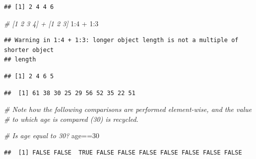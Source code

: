 \documentclass[
]{book}
\newenvironment{Shaded}{\begin{snugshade}}{\end{snugshade}}
\newcommand{\CommentTok}[1]{\textcolor[rgb]{0.56,0.35,0.01}{\textit{#1}}}
\newcommand{\DecValTok}[1]{\textcolor[rgb]{0.00,0.00,0.81}{#1}}
\newcommand{\NormalTok}[1]{#1}
\newcommand{\OtherTok}[1]{\textcolor[rgb]{0.56,0.35,0.01}{#1}}
\newcommand{\SpecialCharTok}[1]{\textcolor[rgb]{0.00,0.00,0.00}{#1}}
\begin{document}
\begin{verbatim}
## [1] 2 4 4 6
\end{verbatim}

\begin{Shaded}
\begin{Highlighting}[]
\CommentTok{\# [1 2 3 4] + [1 2 3]}
\DecValTok{1}\SpecialCharTok{:}\DecValTok{4} \SpecialCharTok{+} \DecValTok{1}\SpecialCharTok{:}\DecValTok{3}
\end{Highlighting}
\end{Shaded}

\begin{verbatim}
## Warning in 1:4 + 1:3: longer object length is not a multiple of shorter object
## length
\end{verbatim}

\begin{verbatim}
## [1] 2 4 6 5
\end{verbatim}

\begin{Shaded}
\end{Shaded}

\begin{verbatim}
##  [1] 61 38 30 25 29 56 52 35 22 51
\end{verbatim}

\begin{Shaded}
\begin{Highlighting}[]
\CommentTok{\# Note how the following comparisons are performed element{-}wise, and the value}
\CommentTok{\# to which age is compared (30) is recycled.}

\CommentTok{\# Is age equal to 30?}
\NormalTok{age}\SpecialCharTok{==}\DecValTok{30}
\end{Highlighting}
\end{Shaded}

\begin{verbatim}
##  [1] FALSE FALSE  TRUE FALSE FALSE FALSE FALSE FALSE FALSE FALSE
\end{verbatim}
\end{document}

